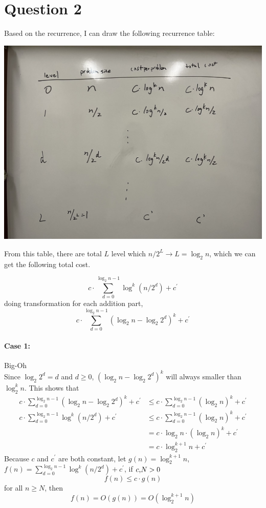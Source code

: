 \documentclass{article}
\begin{document}
\section*{Question 2}
Based on the recurrence, I can draw the following recurrence table:
\begin{center}
    \includegraphics[scale = 0.13]{cool.jpg}
\end{center}
From this table, there are total $L$ level which $n/2^L \rightarrow L = \log_2 n$, which we can get the following total cost.


$$c \cdot \sum^{\log_2 n -1}_{d=0}\log^k (n/2^d) + c^\prime $$
doing transformation for each addition part,
$$c \cdot \sum^{\log_2 n -1}_{d=0}(\log_2 n - \log_2 2^d)^k + c^\prime $$
\paragraph{Case 1:} Big-Oh \\
Since $\log_2 2^d = d$ and $d \geq 0$, $(\log_2 n - \log_2 2^d)^k$ will always smaller than $\log^k_2 n$.
This shows that 
\begin{align}
    c \cdot \sum^{\log_2 n -1}_{d=0}(\log_2 n - \log_2 2^d)^k + c^\prime &\leq c \cdot \sum^{\log_2 n -1}_{d=0}(\log_2 n)^k + c^\prime \nonumber \\
    c \cdot \sum^{\log_2 n -1}_{d=0}\log^k (n/2^d) + c^\prime &\leq c \cdot \sum^{\log_2 n -1}_{d=0}(\log_2 n)^k + c^\prime \nonumber \\ 
    &= c \cdot \log_2 n \cdot (\log_2 n)^k + c^\prime \nonumber \\
    &= c \cdot \log^{k+1}_2 n + c^\prime \nonumber
\end{align}
Because $c$ and $c^\prime$ are both constant, let $g(n) =\log^{k+1}_2 n $, $f(n) =\sum^{\log_2 n -1}_{d=0}\log^k (n/2^d) + c^\prime$, if $c \textmd{,} N> 0$
$$f(n) \leq c \cdot g(n)$$
for all $n \geq N$, then 
$$f(n) = O(g(n)) = O(\log^{k+1}_2 n)$$
\end{document}
